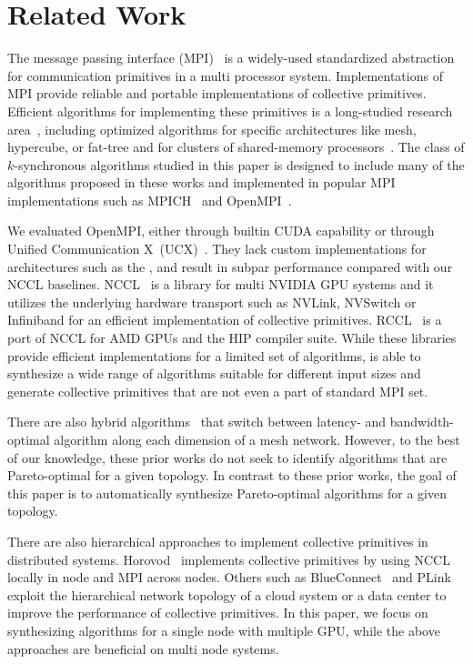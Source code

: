 
\section{Related Work}
The message passing interface (MPI)~\cite{dongarra2013mpi} is a widely-used standardized abstraction for communication primitives in a multi processor system. Implementations of MPI provide reliable and portable implementations of collective primitives. Efficient algorithms for implementing these primitives is a long-studied research area~\cite{pjevsivac2007performance, chan2007collective, thakur2005optimization}, including optimized algorithms for specific architectures like mesh, hypercube, or fat-tree\cite{scott1991efficient,bokhari1992complete,barnett1993global} and for clusters of shared-memory processors~\cite{sistare1999optimization,traff2002improved,sanders2002hierarchical,tipparaju2003fast}. The class of $k$-synchronous algorithms studied in this paper is designed to include many of the algorithms proposed in these works and implemented in popular MPI implementations such as MPICH~\cite{thakur2005optimization} and OpenMPI~\cite{gabriel2004open}.

We evaluated OpenMPI, either through builtin CUDA capability or through Unified Communication X~(UCX)~\cite{ucx}.
They lack custom implementations for architectures such as the \dgxone{}, and result in subpar performance compared with our NCCL baselines.
NCCL~\cite{nccl} is a library for multi NVIDIA GPU systems and it utilizes the underlying hardware transport such as NVLink, NVSwitch or Infiniband for an efficient implementation of collective primitives. RCCL~\cite{rccl} is a port of NCCL for AMD GPUs and the HIP compiler suite. While these libraries provide efficient implementations for a limited set of algorithms, \tool{} is able to synthesize a wide range of algorithms suitable for different input sizes and generate collective primitives that are not even a part of standard MPI set.

There are also hybrid algorithms~\cite{barnett1994building, chan2007collective} that switch between latency- and bandwidth-optimal algorithm along each dimension of a mesh network. However, to the best of our knowledge, these prior works do not seek to identify algorithms that are Pareto-optimal for a given topology. In contrast to these prior works, the goal of this paper is to automatically synthesize Pareto-optimal algorithms for a given topology.  

There are also hierarchical approaches to implement collective primitives in distributed systems. Horovod~\cite{alex2018horovod} implements collective primitives by using NCCL locally in node and MPI across nodes. Others such as BlueConnect~\cite{blueconnect} and PLink~\cite{plink} exploit the hierarchical network topology of a cloud system or a data center to improve the performance of collective primitives. In this paper, we focus on synthesizing algorithms for a single node with multiple GPU, while the above approaches are beneficial on multi node systems.

